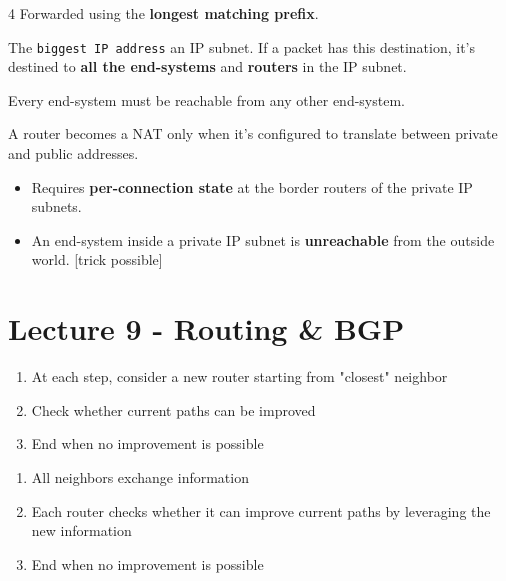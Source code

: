 \documentclass[8pt,a4paper,landscape]{extarticle}
\begin{document}
\begin{multicols*}{4}
Forwarded using the \textbf{longest matching prefix}.

\begin{defn}[title=Broadcast IP address (+1)]
The \texttt{biggest IP address} an IP subnet. If a packet has this destination, it's destined to \textbf{all the end-systems} and \textbf{routers} in the IP subnet.
\end{defn}

\begin{prop}[title=Global reachability]
    Every end-system must be reachable from any other end-system.
\end{prop}
 
\begin{thm}[title=NAT: Layering violation (but it works)]
    A router becomes a NAT only when it's configured to translate between private and public addresses.
    \begin{itemize}
        \item Requires \textbf{per-connection state} at the border routers of the private IP subnets.
        \item An end-system inside a private IP subnet is \textbf{unreachable} from the outside world. [trick possible]
    \end{itemize}
\end{thm}

\section{Lecture 9 - Routing \& BGP}

\begin{prop}[title=Dijkstra's (Link state: converges faster)]
    \begin{enumerate}
        \item At each step, consider a new router starting from "closest" neighbor
        \item Check whether current paths can be improved
        \item End when no improvement is possible
    \end{enumerate}
\end{prop}
\begin{prop}[title=Bellman-Ford (Distance vector: less bandwitdh)]
    \begin{enumerate}
        \item All neighbors exchange information
        \item Each router checks whether it can improve current paths by leveraging the new information
        \item End when no improvement is possible
    \end{enumerate}
\end{prop}


\end{multicols*}
\end{document}
